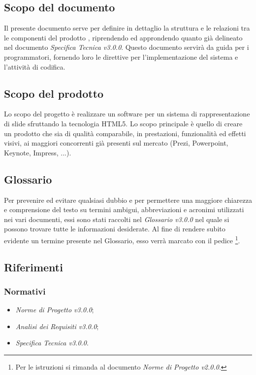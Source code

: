 \subsection{Scopo del documento}
  Il presente documento serve per definire in dettaglio la struttura e le relazioni tra le componenti del prodotto \PROGETTO{}, riprendendo ed approndendo 
  quanto già delineato nel documento \textit{Specifica Tecnica v3.0.0}. Questo documento servirà da guida per i programmatori, fornendo loro le direttive 
  per l'implementazione del sistema e l'attività di codifica.
\subsection{Scopo del prodotto}
  Lo scopo del progetto è realizzare un software per un sistema di rappresentazione di slide sfruttando la tecnologia HTML5. 
  Lo scopo principale è quello di creare un prodotto che sia di qualità comparabile, in prestazioni, funzionalità ed effetti visivi, 
  ai maggiori concorrenti già presenti sul mercato (Prezi, Powerpoint, Keynote, Impress, ...).
\subsection{Glossario}
Per prevenire ed evitare qualsiasi dubbio e per permettere una maggiore chiarezza e comprensione del testo su termini ambigui, abbreviazioni e acronimi 
utilizzati nei vari documenti, essi sono stati raccolti nel \textit{Glossario v3.0.0} nel quale si possono trovare tutte le informazioni desiderate.
Al fine di rendere subito evidente un termine presente nel Glossario, esso verrà marcato con il pedice \G\footnote{Per le istruzioni si rimanda al documento \textit{Norme di Progetto v2.0.0}.}.
\subsection{Riferimenti}
  \subsubsection{Normativi}
      \begin{itemize}
       \item \textit{Norme di Progetto v3.0.0};
       \item \textit{Analisi dei Requisiti v3.0.0};
       \item \textit{Specifica Tecnica v3.0.0}.
      \end{itemize}
